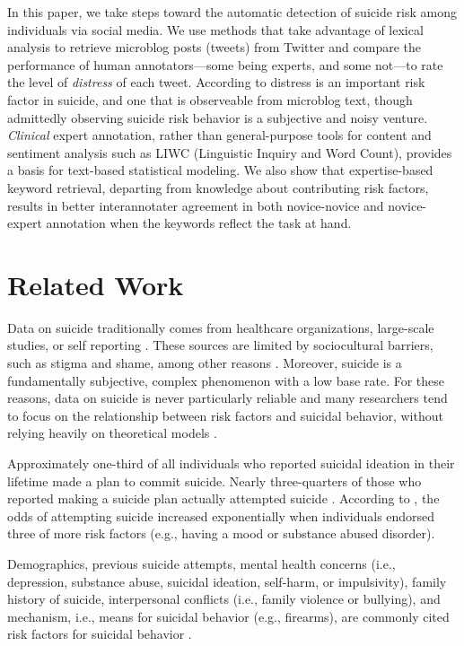 \documentclass[11pt]{article}
\begin{document}
In this paper, we take steps toward the automatic detection of suicide risk among individuals via social media. We use methods that take advantage of lexical analysis to retrieve microblog posts (tweets) from Twitter and compare the performance of human annotators---some being experts, and some not---to rate the level of \emph{distress} of each tweet. According to  distress is an important risk factor in suicide, and one that is observeable from microblog text, though admittedly observing suicide risk behavior is a subjective and noisy venture.  \emph{Clinical} expert annotation, rather than general-purpose tools for content and sentiment analysis such as LIWC (Linguistic Inquiry and Word Count), provides a basis for text-based statistical modeling.
We also show that expertise-based keyword retrieval, departing from knowledge about contributing risk factors, results in better interannotater agreement in both novice-novice and novice-expert annotation when the keywords reflect the task at hand.


\section{Related Work}
Data on suicide traditionally comes from healthcare organizations, large-scale studies, or self reporting \cite{crosby2011self,horowitz2009suicide}. These sources are limited by sociocultural barriers, such as stigma and shame, among other reasons \cite{crosby2011self}. Moreover, suicide is a fundamentally subjective, complex phenomenon with a low base rate. For these reasons, data on suicide is never particularly reliable and many researchers tend to focus on the relationship between risk factors and suicidal behavior, without relying heavily on theoretical models \cite{nock2008suicide}.

Approximately one-third of all individuals who reported suicidal ideation in their lifetime made a plan to commit suicide. Nearly three-quarters of those who reported making a suicide plan actually attempted suicide \cite{kessler1999prevalence}. According to , the odds of attempting suicide increased exponentially when individuals endorsed three of more risk factors (e.g., having a mood or substance abused disorder). 

Demographics, previous suicide attempts, mental health concerns (i.e., depression, substance abuse, suicidal ideation, self-harm, or impulsivity), family history of suicide, interpersonal conflicts (i.e., family violence or bullying), and mechanism, i.e., means for suicidal behavior (e.g., firearms), are commonly cited risk factors for suicidal behavior \cite{nock2008suicide,crosby2011self,gaynes2004screening,harriss2005suicidal,shaffer2004columbia,shaffer2004columbia,brown2000risk}. 
\end{document}
